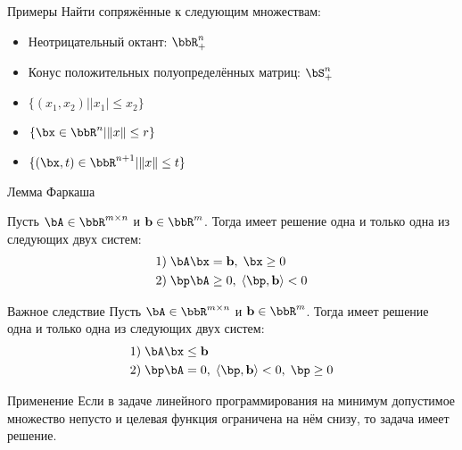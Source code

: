 \documentclass[12pt,russian]{beamer}
\begin{document}
\begin{frame}{Примеры}
Найти сопряжённые к следующим множествам:
\begin{itemize}
\item Неотрицательный октант: $\bbR^n_+$
\item Конус положительных полуопределённых матриц: $\bS^n_+$
\item $\{ (x_1, x_2) | |x_1| \leq x_2 \}$
\item $\{ \bx \in \bbR^n | \| x \| \leq r \}$
\item $\{ (\bx, t) \in \bbR^{n+1} | \| x \| \leq t \}$
\end{itemize}
\end{frame}

\begin{frame}{Лемма Фаркаша}
\scriptsize
\begin{lemma}[Фаркаш]
Пусть $\bA \in \bbR^{m \times n}$ и $\mathbf{b} \in \bbR^m$. Тогда имеет решение одна и только одна из следующих двух систем:
\vspace{-4mm}
\begin{equation*}
\begin{split}
1)& \; \bA\bx = \mathbf{b}, \; \bx \geq 0\\
2)& \; \bp\bA \geq 0, \; \langle \bp, \mathbf{b} \rangle < 0
\end{split}
\end{equation*}
\end{lemma}

\begin{block}{Важное следствие}
Пусть $\bA \in \bbR^{m \times n}$ и $\mathbf{b} \in \bbR^m$. Тогда имеет решение одна и только одна из следующих двух систем:
\vspace{-4mm}
\begin{equation*}
\begin{split}
1)& \; \bA\bx \leq \mathbf{b}\\
2)& \; \bp\bA = 0, \; \langle \bp, \mathbf{b} \rangle < 0, \; \bp \geq 0
\end{split}
\end{equation*}
\end{block}

\begin{block}{Применение}
Если в задаче линейного программирования на минимум допустимое множество непусто и целевая функция ограничена на нём снизу, то задача имеет решение.
\end{block}

\end{frame}
\end{document}
